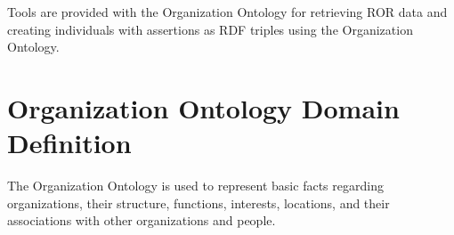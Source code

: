 \documentclass[letterpaper,10pt,english]{sphinxmanual}
\begin{document}
\sphinxAtStartPar
Tools are provided with the Organization Ontology for retrieving ROR data and
creating individuals with assertions as RDF triples using the Organization Ontology.
\label{\detokenize{domain-definition:domain-definition}}
\ignorespaces 

\chapter{Organization Ontology Domain Definition}
\label{\detokenize{domain-definition:organization-ontology-domain-definition}}\label{\detokenize{domain-definition:index-0}}\label{\detokenize{domain-definition::doc}}
\sphinxAtStartPar
The Organization Ontology is used to represent basic facts regarding organizations,
their structure, functions, interests, locations, and
their associations with other organizations and people.

\ignorespaces 
\end{document}
